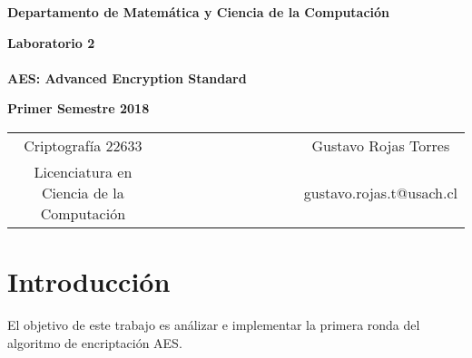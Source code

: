\documentclass{report}
\begin{document}
\begin{titlepage}
\begin{center}
\end{center}
\begin{center}
{\bf Departamento de Matem\'atica y Ciencia de la Computaci\'on}
\end{center}
\vspace{3cm}
\begin{center}
%
%
{\Large \bf Laboratorio 2 \\
~~ \\
AES: Advanced Encryption Standard}
%
%
\end{center}
\begin{center}
%
%
%
{\large \bf Primer Semestre 2018}
%
%
\end{center}
\vspace{5cm}
\begin{tabular}{c l c}
%
%
%
Criptograf\'ia 22633 & ~~~~~~~~~~~~~~~~~ & Gustavo Rojas Torres \\
%
%
%
Licenciatura en Ciencia de la Computaci\'on & ~~ & gustavo.rojas.t@usach.cl 
%
%
\end{tabular}
\end{titlepage}
%
\section{Introducci\'on}
El objetivo de este trabajo es an\'alizar e implementar la primera ronda del algoritmo de encriptaci\'on AES.
%
\end{document}
